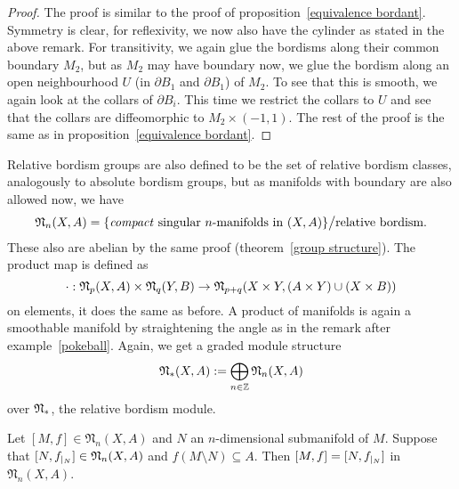 \documentclass[a4paper,11pt]{article}
\begin{document}
\begin{proof}
    The proof is similar to the proof of proposition\ \ref{equivalence bordant}. 
    Symmetry is clear, for reflexivity, we now also have the cylinder as stated in the above remark. 
    For transitivity, we again glue the bordisms along their common boundary \(M_2\), but as \(M_2\) may have boundary now, we glue the bordism along an open neighbourhood \(U\) (in \(\partial B_1\) and \(\partial B_1\)) of \(M_2\). 
    To see that this is smooth, we again look at the collars of \(\partial B_i\). This time we restrict the collars to \(U\) and see that the collars are diffeomorphic to \(M_2\times(-1,1)\). The rest of the proof is the same as in proposition\ \ref{equivalence bordant}. 
\end{proof}

Relative bordism groups are also defined to be the set of relative bordism classes, analogously to absolute bordism groups, but as manifolds with boundary are also allowed now, we have
\[\mathfrak{N}_n(X,A)=\{\text{\textit{compact} singular $n$-manifolds in $(X,A)$}\}\big/\text{relative bordism}.\]
These also are abelian by the same proof (theorem\ \ref{group structure}). The product map is defined as \[\cdot:\mathfrak{N}_p(X,A)\times\mathfrak{N}_q(Y,B)\to\mathfrak{N}_{p+q}(X\times Y, (A\times Y)\cup(X\times B))\]
on elements, it does the same as before. A product of manifolds is again a smoothable manifold by straightening the angle as in the remark after example\ \ref{pokeball}. Again, we get a graded module structure
\[\mathfrak{N}_\ast(X,A):= \bigoplus_{n\in\mathbb{Z}}\mathfrak{N}_n(X,A)\]
over \(\mathfrak{N}_\ast\), the relative bordism module.

\begin{lemma}\label{almost excision} %
    Let \([M,f]\in\mathfrak{N}_n(X,A)\) and \(N\) an \(n\)-dimensional submanifold of \(M\). 
    Suppose that \([N,f_{|_{N}}]\in\mathfrak{N}_n(X,A)\) and \(f(M\setminus N)\subseteq A\). 
    Then \([M,f]=[N,f_{|_{N}}]\) in \(\mathfrak{N}_n(X,A)\).
\end{lemma}
\end{document}
